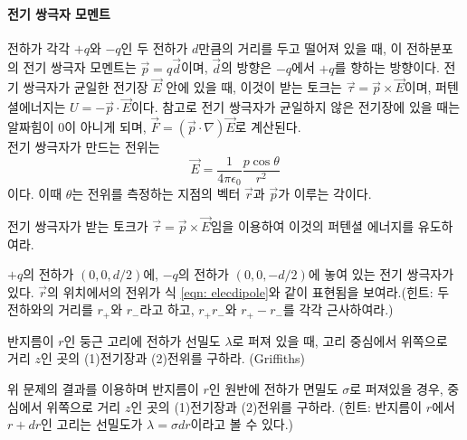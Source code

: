 \paragraph{전기 쌍극자 모멘트} 전하가 각각 $+q$와 $-q$인 두 전하가 $d$만큼의 거리를 두고 떨어져 있을 때, 이 전하분포의 전기 쌍극자 모멘트는 $\vec{p}=q\vec{d}$이며, $\vec{d}$의 방향은 $-q$에서 $+q$를 향하는 방향이다. 전기 쌍극자가 균일한 전기장 $\vec{E}$ 안에 있을 때, 이것이 받는 토크는 $\vec{\tau}=\vec{p}\times \vec{E}$이며, 퍼텐셜에너지는 $U=-\vec{p} \cdot \vec{E}$이다. 참고로 전기 쌍극자가 균일하지 않은 전기장에 있을 때는 알짜힘이 0이 아니게 되며, $\vec{F}=(\vec{p}\cdot \nabla)\vec{E}$로 계산된다.\\
전기 쌍극자가 만드는 전위는 
\begin{equation}\label{eqn: elecdipole}
\vec{E} = \frac{1}{4\pi\epsilon_0}\frac{p\cos\theta}{r^2}
\end{equation}
이다. 이때 $\theta$는 전위를 측정하는 지점의 벡터 $\vec{r}$과 $\vec{p}$가 이루는 각이다. 
\begin{exercise}
전기 쌍극자가 받는 토크가 $\vec{\tau}=\vec{p}\times \vec{E}$임을 이용하여 이것의 퍼텐셜 에너지를 유도하여라.
\end{exercise}

\begin{exercise}
$+q$의 전하가 $(0,0,d/2)$에, $-q$의 전하가 $(0,0,-d/2)$에 놓여 있는 전기 쌍극자가 있다. $\vec{r}$의 위치에서의 전위가 식 \ref{eqn: elecdipole}와 같이 표현됨을 보여라.(힌트: 두 전하와의 거리를 $r_+$와 $r_-$라고 하고, $r_+r_-$와 $r_+-r_-$를 각각 근사하여라.)
\end{exercise}

\begin{problem}
반지름이 $r$인 둥근 고리에 전하가 선밀도 $\lambda$로 퍼져 있을 때, 고리 중심에서 위쪽으로 거리 $z$인 곳의 (1)전기장과 (2)전위를 구하라. (Griffiths)
\end{problem}

\begin{problem}
위 문제의 결과를 이용하며 반지름이 $r$인 원반에 전하가 면밀도 $\sigma$로 퍼져있을 경우, 중심에서 위쪽으로 거리 $z$인 곳의 (1)전기장과 (2)전위를 구하라. (힌트: 반지름이 $r$에서 $r+dr$인 고리는 선밀도가 $\lambda=\sigma dr$이라고 볼 수 있다.)
\end{problem}

